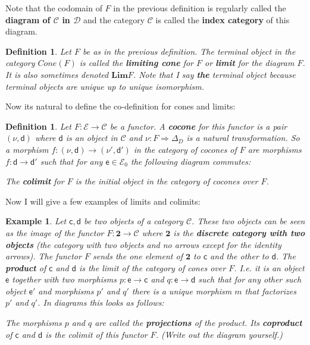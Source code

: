 \documentclass{article}
\newcommand{\cat}[1]{\mathcal{#1}} %
\newcommand{\cato}[1]{\cat{#1}_0} %
\newcommand{\ob}[1]{\mathsf{#1}} %
\newcommand{\limc}[1]{\bm{Lim}#1}
\newtheorem{definition}[theorem]{Definition}
\newtheorem{example}[theorem]{Example}
\begin{document}
Note that the codomain of $F$ in the previous definition is regularly called the \textbf{diagram of $\cat{C}$ in $\cat{D}$} and the category $\cat{C}$ is called the \textbf{index category} of this diagram.

\begin{definition}
	Let $F$ be as in the previous definition. The terminal object in the category $Cone(F)$ is called the \textbf{limiting cone} for $F$ or \textbf{limit} for the diagram $F$. It is also sometimes denoted $\limc{F}$.
	Note that I say \textbf{the} terminal object because terminal objects are unique up to unique isomorphism.

\end{definition}

Now its natural to define the co-definition for cones and limits:

\begin{definition}
	Let $F: \cat{E} \rightarrow \cat{C}$ be a functor. A \textbf{cocone} for this functor is a pair $(\nu, \ob{d})$ where $\ob{d}$ is an object in $\cat{C}$ and $\nu: F \Rightarrow \Delta_D$ is a natural transformation.
	So a morphism $f: (\nu, \ob{d}) \rightarrow (\nu', \ob{d}')$ in the category of cocones of $F$ are morphisms $f: \ob{d} \rightarrow \ob{d}'$ such that for any $\ob{e} \in \cato{E}$ the following diagram commutes:
	The \textbf{colimit} for $F$ is the initial object in the category of cocones over $F$.
\end{definition}

Now I will give a few examples of limits and colimits:

\begin{example}
	Let $\ob{c}, \ob{d}$ be two objects of a category $\cat{C}$. These two objects can be seen as the image of the functor $F: \bm{2} \rightarrow \cat{C}$ where $\bm{2}$ is the \textbf{discrete category with two objects}
	(the category with two objects and no arrows except for the identity arrows). The functor $F$ sends the one element of $\bm{2}$ to $\ob{c}$ and the other to $\ob{d}$.
	The \textbf{product} of $\ob{c}$ and $\ob{d}$ is the limit of the category of cones over $F$.
	I.e. it is an object $\ob{e}$ together with two morphisms $p: \ob{e} \rightarrow \ob{c}$ and $q: \ob{e} \rightarrow \ob{d}$ such that for any other such object $\ob{e}'$ and morphisms $p'$ and $q'$ there is a unique morphism $m$ that factorizes $p'$ and $q'$.
	In diagrams this looks as follows:
	The morphisms $p$ and $q$ are called the \textbf{projections} of the product.
	Its \textbf{coproduct} of $\ob{c}$ and $\ob{d}$ is the colimit of this functor $F$. (Write out the diagram yourself.)
\end{example}
\end{document}
